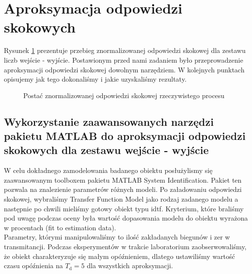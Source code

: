 \section{Aproksymacja odpowiedzi skokowych}
\label{zad3_lab_opis}
Rysunek \ref{lab3_odp_skok_s} prezentuje przebieg znormalizowanej odpowiedzi skokowej dla zestawu liczb wejście - wyjście. Postawionym przed nami zadaniem było przeprowadzenie aproksymacji odpowiedzi skokowej dowolnym narzędziem. W kolejnych punktach opisujemy jak tego dokonaliśmy i jakie uzyskaliśmy rezultaty. 
\begin{figure}[b]
    \centering
    \caption{Postać znormalizowanej odpowiedzi skokowej rzeczywistego procesu}
    \label{lab3_odp_skok_s}
\end{figure}
\FloatBarrier

\subsection{Wykorzystanie zaawansowanych narzędzi pakietu MATLAB do aproksymacji odpowiedzi skokowych dla zestawu wejście - wyjście}
W celu dokładnego zamodelowania badanego obiektu posłużylismy
się zaawansowanym toolboxem pakietu MATLAB System Identification.
Pakiet ten pozwala na znalezienie parametrów różnych modeli. Po załadowaniu
odpowiedzi skokowej, wybraliśmy Transfer Function Model jako rodzaj zadanego
modelu a następnie po chwili mieliśmy gotowy obiekt typu idtf. Kryterium, które braliśmy pod uwagę podczas oceny była wartość dopasowania modelu do obiektu wyrażona w procentach (fit to estimation data). \\
\indent Parametry, którymi manipulowaliśmy to ilość zakładanych biegunów i zer w transmitancji. Podczas eksperymentów w trakcie laboratorium zaobserwowaliśmy, że obiekt charakteryzuje się małym opóźnieniem, dlatego ustawiliśmy wartość czasu opóźnienia na $T_{\mathrm{d}}=5$ dla wszystkich aproksymacji. 
\\

